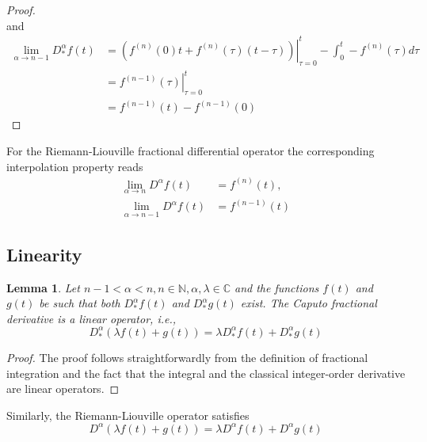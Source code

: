 \documentclass[a4paper,14pt,oneside]{book}
\theoremstyle{plain}
\newtheorem{lem}[thm]{Lemma}
\theoremstyle{definition}
\theoremstyle{remark}
\begin{document}
\begin{center}
\begin{flushleft}
{\begin{proof}
$$$$
and
$$
\begin{aligned}
\lim_{\alpha \rightarrow n-1} D_{*}^{\alpha} f(t) &=\left.\left(f^{(n)}(0) t+f^{(n)}(\tau)(t-\tau)\right)\right|_{\tau=0}^{t}-\int_{0}^{t}-f^{(n)}(\tau) d \tau \\
&=\left.f^{(n-1)}(\tau)\right|_{\tau=0} ^{t} \\
&=f^{(n-1)}(t)-f^{(n-1)}(0)
\end{aligned}
$$
\end{proof}
For the Riemann-Liouville fractional differential operator the corresponding interpolation property reads
$$
\begin{aligned}
\lim _{\alpha \rightarrow n} D^{\alpha} f(t) &=f^{(n)}(t), \\
\lim _{\alpha \rightarrow n-1} D^{\alpha} f(t) &=f^{(n-1)}(t)
\end{aligned}
$$

\subsection{Linearity}
\begin{lem}
Let $n-1<\alpha<n, n \in \mathbb{N}, \alpha, \lambda \in \mathbb{C}$ and the functions $f(t)$ and $g(t)$ be such that both $D_{*}^{\alpha} f(t)$ and $D_{*}^{\alpha} g(t)$ exist. The Caputo fractional derivative is a linear operator, i.e.,
\begin{equation}\label{eq:4.8}
D_{*}^{\alpha}(\lambda f(t)+g(t))=\lambda D_{*}^{\alpha} f(t)+D_{*}^{\alpha} g(t)
\end{equation}
\end{lem}
\begin{proof}
The proof follows straightforwardly from the definition of fractional integration and the fact that the integral and the classical integer-order derivative are linear operators.
\end{proof}
Similarly, the Riemann-Liouville operator satisfies
$$
D^{\alpha}(\lambda f(t)+g(t))=\lambda D^{\alpha} f(t)+D^{\alpha} g(t)
$$

}
\end{flushleft}
\end{center}
\end{document}
